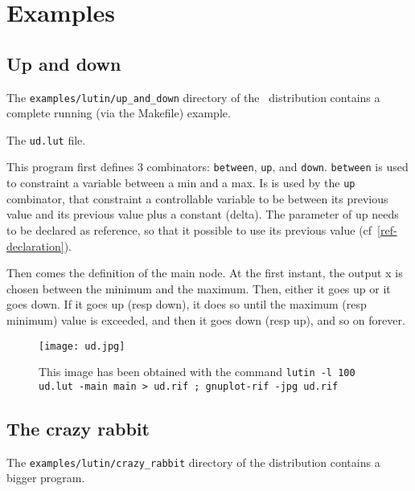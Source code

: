 \section{Examples}

\subsection{Up and down}
\label{up-and-down}


The {\tt examples/lutin/up\_and\_down}  directory of the \lutin\ distribution
contains a complete running (via the Makefile) example.

\begin{example}
The {\tt ud.lut} file.
\begin{alltt}
\begin{small}

\end{small}
\end{alltt}
\end{example}


This program  first defines 3  combinators: {\tt between},  {\tt up},
and  {\tt down}.   {\tt between}  is  used to  constraint a  variable
between a min and a max. Is  is used by the {\tt up} combinator, that
constraint a  controllable variable to be between  its previous value
and its previous value plus  a constant (delta).  The parameter of up
needs to  be declared as  reference, so that  it possible to  use its
previous value (cf~\ref{ref-declaration}).

Then comes the definition of the main node. At the first instant, the
output x is chosen between  the minimum and the maximum. Then, either
it goes  up or it goes  down. If it goes  up (resp down),  it does so
until the maximum (resp minimum)  value is exceeded, and then it goes
down (resp up), and so on forever.



\begin{figure}
\texttt{[image: ud.jpg]}
\caption{
This  image has  been obtained  with the  command {\tt  lutin  -l 100
  ud.lut -main main > ud.rif ; gnuplot-rif -jpg ud.rif}
}\label{gnuplot-ud}
\end{figure}

\subsection{The crazy rabbit}

The  {\tt   examples/lutin/crazy\_rabbit}  directory  of   the  \lutin
distribution contains a bigger program.


